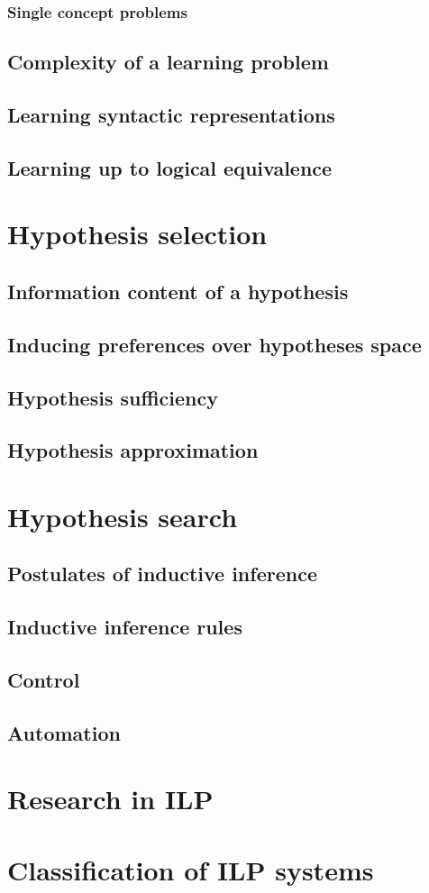 \subsubsection{Single concept problems}


\subsection{Complexity of a learning problem}
\subsection{Learning syntactic representations}
\subsection{Learning up to logical equivalence}
\section{Hypothesis selection}
\subsection{Information content of a hypothesis}
\subsection{Inducing preferences over hypotheses space}
\subsection{Hypothesis sufficiency}
\subsection{Hypothesis approximation}
\section{Hypothesis search}
\subsection{Postulates of inductive inference}
\subsection{Inductive inference rules}
\subsection{Control}
\subsection{Automation}
\section{Research in ILP}
\section{Classification of ILP systems}